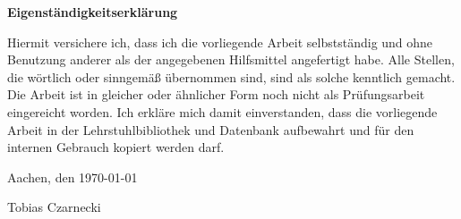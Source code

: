 \Large
\textsf{\textbf{Eigenständigkeitserklärung}}


\normalsize
\textsf{Hiermit versichere ich, dass ich die vorliegende Arbeit selbstständig und ohne Benutzung anderer als der angegebenen Hilfsmittel angefertigt habe. Alle Stellen, die wörtlich oder sinngemäß übernommen sind, sind als solche kenntlich gemacht. Die Arbeit ist in gleicher oder ähnlicher Form noch nicht als Prüfungsarbeit eingereicht worden. Ich erkläre mich damit einverstanden, dass die vorliegende Arbeit in der Lehrstuhlbibliothek und Datenbank aufbewahrt und für den internen Gebrauch kopiert werden darf.} \newline \newline


\textsf{Aachen, den \today \newline \newline}


\textsf{Tobias Czarnecki}
